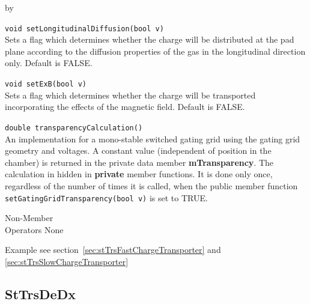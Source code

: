 \documentclass[twoside]{article}
\newcommand{\entrylabel}[1]{\mbox{\textbf{{#1}}}\hfil}%
\newenvironment{entry}
{\begin{list}{}%
    {\renewcommand{\makelabel}{\entrylabel}%
     \setlength{\labelwidth}{90pt}%
     \setlength{\leftmargin}{\labelwidth}
     \advance\leftmargin by \labelsep%
      }%
    }%
  {\end{list}}
\newcommand{\Entrylabel}[1]%
{\raisebox{0pt}[1ex][0pt]{\makebox[\labelwidth][l]%
    {\parbox[t]{\labelwidth}{\hspace{0pt}\textbf{{#1}}}}}}
\newenvironment{Entry}%
{\renewcommand{\entrylabel}{\Entrylabel}\begin{entry}}%
  {\end{entry}}
\begin{document}
\begin{Entry}
  \verb+void setLongitudinalDiffusion(bool v)+\\
  Sets a flag which determines whether the charge will be distributed
  at the pad plane according to the diffusion properties of the gas
  in the longitudinal direction only.  Default is FALSE.
  
  \verb+void setExB(bool v)+\\
  Sets a flag which determines whether the charge will be transported
  incorporating the effects of the magnetic field.  Default is FALSE.

  \verb+double transparencyCalculation()+\\
  An implementation for a mono-stable switched gating grid using
  the gating grid geometry and voltages.  A constant value (independent
  of position in the chamber) is returned in the private data member
  {\bf mTransparency}.  The calculation in hidden in {\bf private}
  member functions.  It is done only once, regardless of the number of
  times it is called, when the public member 
  function \texttt{setGatingGridTransparency(bool v)} is set to TRUE.

\item[Non-Member \\ Operators]
  None

\item[Example]
  see section~\ref{sec:stTrsFastChargeTransporter} and 
  \ref{sec:stTrsSlowChargeTransporter}

\end{Entry}
\clearpage

%
%
\subsection{StTrsDeDx} 
\label{sec:stTrsDeDx}
\end{document}
